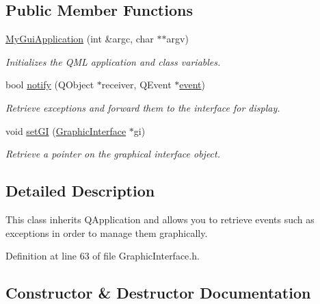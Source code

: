 \subsection*{Public Member Functions}
\begin{DoxyCompactItemize}
\item 
\hyperlink{class_my_gui_application_ab4e82f1ef9d56a8ca3d8c8095a21bc73}{My\+Gui\+Application} (int \&argc, char $\ast$$\ast$argv)
\begin{DoxyCompactList}\small\item\em Initializes the Q\+ML application and class variables. \end{DoxyCompactList}\item 
bool \hyperlink{class_my_gui_application_a137204a4e17e47ba3d633942f83e7433}{notify} (Q\+Object $\ast$receiver, Q\+Event $\ast$\hyperlink{pkcs11t_8h_afaa077e4b9760c92cbaf0d838e743d8c}{event})
\begin{DoxyCompactList}\small\item\em Retrieve exceptions and forward them to the interface for display. \end{DoxyCompactList}\item 
void \hyperlink{class_my_gui_application_ab9de52ff003026a88a3721ae0ad2d63c}{set\+GI} (\hyperlink{class_graphic_interface}{Graphic\+Interface} $\ast$gi)
\begin{DoxyCompactList}\small\item\em Retrieve a pointer on the graphical interface object. \end{DoxyCompactList}\end{DoxyCompactItemize}


\subsection{Detailed Description}
This class inherits Q\+Application and allows you to retrieve events such as exceptions in order to manage them graphically. 

Definition at line 63 of file Graphic\+Interface.\+h.



\subsection{Constructor \& Destructor Documentation}
\mbox{\label{class_my_gui_application_ab4e82f1ef9d56a8ca3d8c8095a21bc73}} 
